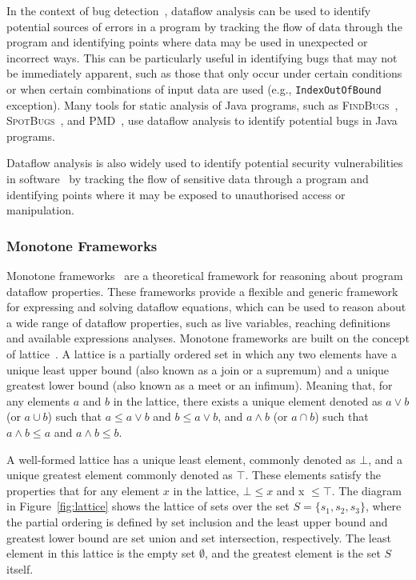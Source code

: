 In the context of bug detection~\cite{spoon, fink2012wala}, dataflow analysis can be used to identify
potential sources of errors in a program by tracking the flow of data through
the program and identifying points where data may be used in unexpected or
incorrect ways. This can be particularly useful in identifying bugs that may
not be immediately apparent, such as those that only occur under certain
conditions or when certain combinations of input data are used (e.g., \texttt{IndexOutOfBound} exception).
Many tools for static analysis of Java programs, such as \textsc{FindBugs}~\cite{findbugs},
\textsc{SpotBugs}~\cite{spotbugs}, and \textsc{PMD}~\cite{copeland2005pmd}, use dataflow analysis to identify
potential bugs in Java programs.

Dataflow analysis is also widely used to identify potential security vulnerabilities
in software~\cite{flowDroid,piskachev2021secucheck,lawall10coccinelle}
by tracking the flow of sensitive data through a program and
identifying points where it may be exposed to unauthorised access or manipulation.


\subsubsection*{Monotone Frameworks}
\label{sec:monotoneframeworks}
Monotone frameworks~\cite{kam1977monotone} are a theoretical framework for reasoning
about program dataflow properties.
These frameworks provide a flexible and generic framework for expressing and solving
dataflow equations, which can be used to reason about a wide range of dataflow
properties, such as live variables, reaching definitions and available expressions analyses.
Monotone frameworks are built on the concept of lattice~\cite{Donnellan1968,Birkhoff1967,cousot1977ai}.
A lattice is a partially ordered set in which any two elements have a unique least
upper bound (also known as a join or a supremum) and a unique greatest lower bound
(also known as a meet or an infimum). Meaning that, for any elements $a$ and $b$ in
the lattice, there exists a unique element denoted as  $a \vee b$  (or  $a \cup b$)
such that  $a \leq a \vee b$  and  $ b \leq a \vee b$, and  $a \wedge b$
(or  $ a\cap b$) such that  $ a\wedge b\leq a$  and  $a \wedge b\leq b$.

A well-formed lattice has a unique least element, commonly denoted as $\bot$,
and a unique greatest element commonly denoted as $\top$. These elements satisfy
the properties that for any element $x$ in the lattice, $\bot \leq x$ and x $\leq \top$.
The diagram in Figure~\ref{fig:lattice} shows the lattice of sets over the set
$S = \{s_1, s_2, s_3\}$, where the partial ordering is defined by set inclusion
and the least upper bound and greatest lower bound are set union and set intersection,
respectively. The least element in this lattice is the empty set $\emptyset$, and the
greatest element is the set $S$ itself.

